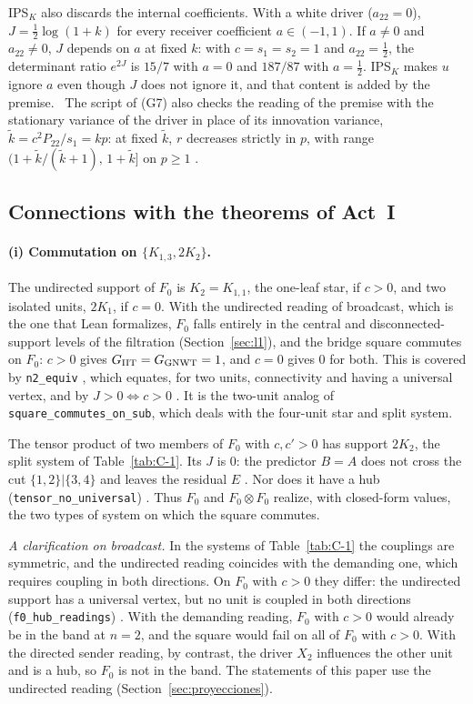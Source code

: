 IPS$_K$ also discards the internal coefficients. With a white driver ($a_{22}=0$), $J=\tfrac12\log(1+k)$ for every receiver coefficient $a\in(-1,1)$. If $a\ne0$ and $a_{22}\ne0$, $J$ depends on $a$ at fixed $k$: with $c=s_1=s_2=1$ and $a_{22}=\tfrac12$, the determinant ratio $e^{2J}$ is $15/7$ with $a=0$ and $187/87$ with $a=\tfrac12$. IPS$_K$ makes $u$ ignore $a$ even though $J$ does not ignore it, and that content is added by the premise. \stS\ The script of (G7) also checks the reading of the premise with the stationary variance of the driver in place of its innovation variance, $\tilde k=c^2P_{22}/s_1=kp$: at fixed $\tilde k$, $r$ decreases strictly in $p$, with range $(1+\tilde k/(\tilde k+1),\,1+\tilde k]$ on $p\ge1$ \stS.

\subsection{Connections with the theorems of Act~I}
\paragraph{(i) Commutation on $\{K_{1,3},2K_2\}$.} The undirected support of $F_0$ is $K_2=K_{1,1}$, the one-leaf star, if $c>0$, and two isolated units, $2K_1$, if $c=0$. With the undirected reading of broadcast, which is the one that Lean formalizes, $F_0$ falls entirely in the central and disconnected-support levels of the filtration (Section~\ref{sec:l1}), and the bridge square commutes on $F_0$: $c>0$ gives $G_{\rm IIT}=G_{\rm GNWT}=1$, and $c=0$ gives $0$ for both. This is covered by \texttt{n2\_equiv} \stL, which equates, for two units, connectivity and having a universal vertex, and by $J>0\iff c>0$ \stS. It is the two-unit analog of \texttt{square\_commutes\_on\_sub}, which deals with the four-unit star and split system.

The tensor product of two members of $F_0$ with $c,c'>0$ has support $2K_2$, the split system of Table~\ref{tab:C-1}. Its $J$ is $0$: the predictor $B=A$ does not cross the cut $\{1,2\}|\{3,4\}$ and leaves the residual $E$ \stS. Nor does it have a hub (\texttt{tensor\_no\_universal}) \stL. Thus $F_0$ and $F_0\otimes F_0$ realize, with closed-form values, the two types of system on which the square commutes.

\emph{A clarification on broadcast.} In the systems of Table~\ref{tab:C-1} the couplings are symmetric, and the undirected reading coincides with the demanding one, which requires coupling in both directions. On $F_0$ with $c>0$ they differ: the undirected support has a universal vertex, but no unit is coupled in both directions (\texttt{f0\_hub\_readings}) \stL. With the demanding reading, $F_0$ with $c>0$ would already be in the band at $n=2$, and the square would fail on all of $F_0$ with $c>0$. With the directed sender reading, by contrast, the driver $X_2$ influences the other unit and is a hub, so $F_0$ is not in the band. The statements of this paper use the undirected reading (Section~\ref{sec:proyecciones}).

